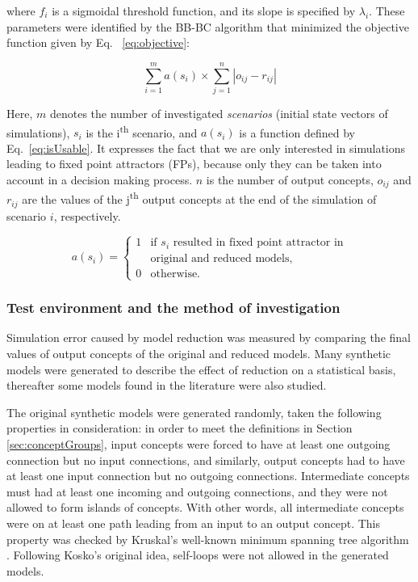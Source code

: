 \documentclass[graybox]{svmult}
\begin{document}
\noindent where $f_i$ is a sigmoidal threshold function, and its slope is 
specified by $\lambda_i$. These parameters were identified by the 
BB-BC algorithm that minimized the objective function given by Eq.~
\ref{eq:objective}:

\begin{equation}
  \label{eq:objective}
  \sum_{i=1}^{m} a(s_i) \times \sum_{j=1}^{n} |o_{ij} - r_{ij}|
\end{equation}

Here, $m$ denotes the number of investigated \emph{scenarios} (initial 
state vectors of simulations), $s_i$ is the i\textsuperscript{th} 
scenario, and $a(s_i)$ is a function defined by Eq.~\ref{eq:isUsable}. 
It expresses the fact that we are only interested in simulations 
leading to fixed point attractors (FPs), because only they can be taken into 
account in a decision making process. $n$ is the number of output 
concepts, $o_{ij}$ and $r_{ij}$ are the values of the 
j\textsuperscript{th} output concepts at the end of the simulation of 
scenario $i$, respectively.

\begin{equation}
  \label{eq:isUsable}
  a(s_i) = \left\{ \begin{array}{ll}
                     1 & \textrm{if } s_i \textrm{ resulted in fixed point attractor in} \\
                       & \textrm{original and reduced models,} \\
                     0 & \textrm{otherwise.}
                   \end{array} \right.
\end{equation}

\subsubsection{Test environment and the method of investigation}
\label{sec:testEnvironment}

Simulation error caused by model reduction was measured by comparing 
the final values of output concepts of the original and reduced models. 
Many synthetic models were generated to describe the effect of 
reduction on a statistical basis, thereafter some models found in the 
literature were also studied.

The original synthetic models were generated randomly, taken the 
following properties in consideration: in order to meet the definitions 
in Section \ref{sec:conceptGroups}, input concepts were forced to have 
at least one outgoing connection but no input connections, and 
similarly, output concepts had to have at least one input connection 
but no outgoing connections. Intermediate concepts must had at least 
one incoming and outgoing connections, and they were not allowed to 
form islands of concepts. With other words, all intermediate concepts 
were on at least one path leading from an input to an output concept. 
This property was checked by Kruskal's well-known minimum spanning tree 
algorithm \cite{kruskal1956shortest}. Following Kosko's original idea, 
self-loops were not allowed in the generated models.
\end{document}
